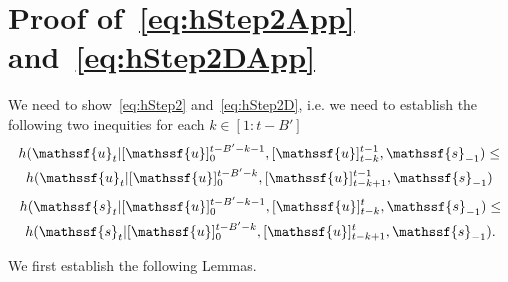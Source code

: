 \documentclass[journal, twocolumn, 10pt]{IEEEtran}
\newcommand{\rvs}{{\mathssf{s}}}    %
\newcommand{\rvu}{{\mathssf{u}}}    %
\newcommand{\bof}[1]{\textbf{#1}}
\begin{document}
{%
%
%
%
%
%
%
%
%
% 

\section{Proof of~\eqref{eq:hStep2App} and~\eqref{eq:hStep2DApp}}
\label{App:hStep2}

We need to show~\eqref{eq:hStep2} and~\eqref{eq:hStep2D}, i.e. we need to establish the following two inequities for each $k \in [1:t-B']$
\begin{multline}
h( \rvu_{t} | [\rvu]_{0}^{t-B'-k-1}, [\rvu]_{t-k}^{t-1}, \rvs_{-1})\le \\ h( \rvu_{t} | [\rvu]_{0}^{t-B'-k}, [\rvu]_{t-k+1}^{t-1}, \rvs_{-1})\label{eq:hStep2App}\end{multline}\begin{multline}
h( \rvs_{t} | [\rvu]_{0}^{t-B'-k-1}, [\rvu]_{t-k}^{t}, \rvs_{-1})\le \\ h( \rvs_{t} | [\rvu]_{0}^{t-B'-k}, [\rvu]_{t-k+1}^{t}, \rvs_{-1})\label{eq:hStep2DApp}.
\end{multline}


We first establish the following Lemmas.

}
\end{document}
